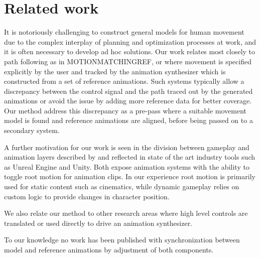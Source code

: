 \section{Related work}
It is notoriously challenging to construct general models for human movement due to the complex interplay of planning and optimization processes at work, and it is often necessary to develop ad hoc solutions. Our work relates most closely to path following as in MOTIONMATCHINGREF, \citep{holden.16} or \citep{startke20} where movement is specified explicitly by the user and tracked by the animation synthesizer which is constructed from a set of reference animations. Such systems typically allow a discrepancy between the control signal and the path traced out by the generated animations or avoid the issue by adding more reference data for better coverage. Our method address this discrepancy as a pre-pass where a suitable movement model is found and reference animations are aligned, before being passed on to a secondary system.  

A further motivation for our work is seen in the division between gameplay and animation layers described by \citep{holden18} and reflected in state of the art industry tools such as Unreal Engine and Unity. Both expose animation systems with the ability to toggle root motion for animation clips. In our experience root motion is primarily used for static content such as cinematics, while dynamic gameplay relies on custom logic to provide changes in character position. 

We also relate our method to other research areas where high level controls are translated or used directly to drive an animation synthesizer. 

To our knowledge no work has been published with synchronization between model and reference animations by adjustment of both components.

